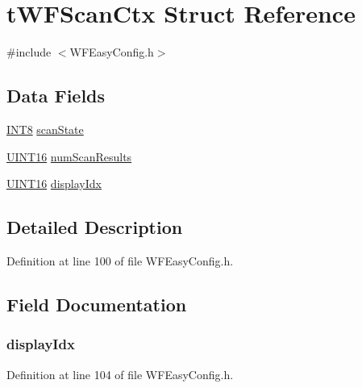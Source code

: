 \hypertarget{structt_w_f_scan_ctx}{}\section{t\+W\+F\+Scan\+Ctx Struct Reference}
\label{structt_w_f_scan_ctx}


{\ttfamily \#include $<$W\+F\+Easy\+Config.\+h$>$}

\subsection*{Data Fields}
\begin{DoxyCompactItemize}
\item 
\hyperlink{_generic_type_defs_8h_a7ebe70ceca856797319175e30bcf003d}{I\+N\+T8} \hyperlink{structt_w_f_scan_ctx_a06d254e47e877e10e34f120bcaec1940}{scan\+State}
\item 
\hyperlink{_generic_type_defs_8h_acfa284fa8026c4aace2728f7f15d6c13}{U\+I\+N\+T16} \hyperlink{structt_w_f_scan_ctx_a8e94e023d6efb11536a80d53f659b9f5}{num\+Scan\+Results}
\item 
\hyperlink{_generic_type_defs_8h_acfa284fa8026c4aace2728f7f15d6c13}{U\+I\+N\+T16} \hyperlink{structt_w_f_scan_ctx_ac6009a0d39ec6ddc1859f6cb3016b363}{display\+Idx}
\end{DoxyCompactItemize}


\subsection{Detailed Description}


Definition at line 100 of file W\+F\+Easy\+Config.\+h.



\subsection{Field Documentation}
\hypertarget{structt_w_f_scan_ctx_ac6009a0d39ec6ddc1859f6cb3016b363}{}
\subsubsection[{display\+Idx}]{ display\+Idx}\label{structt_w_f_scan_ctx_ac6009a0d39ec6ddc1859f6cb3016b363}


Definition at line 104 of file W\+F\+Easy\+Config.\+h.

